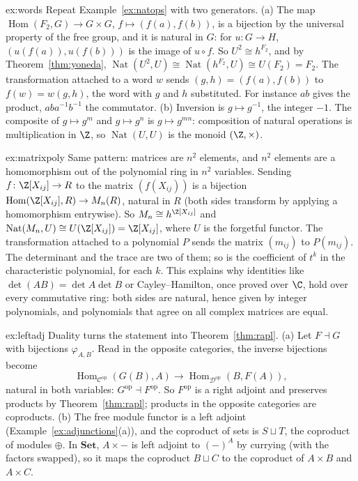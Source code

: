 \begin{solution}{ex:words}
\idea Repeat Example~\ref{ex:natops} with two generators.
\writeup (a) The map $\operatorname{Hom}(F_2,G)\to G\times G$, $f\mapsto(f(a),f(b))$, is a bijection by the universal property of the free group, and it is natural in $G$: for $u\colon G\to H$, $(u(f(a)),u(f(b)))$ is the image of $u\circ f$. So
$U^2\cong h^{F_2}$, and by Theorem~\ref{thm:yoneda}, $\operatorname{Nat}(U^2,U)\cong\operatorname{Nat}(h^{F_2},U)\cong U(F_2)=F_2$. The transformation attached to a word $w$ sends $(g,h)=(f(a),f(b))$ to $f(w)=w(g,h)$, the word with $g$ and $h$
substituted. For instance $ab$ gives the product, $aba^{-1}b^{-1}$ the commutator.
(b) Inversion is $g\mapsto g^{-1}$, the integer $-1$. The composite of $g\mapsto g^m$ and $g\mapsto g^n$ is $g\mapsto g^{mn}$: composition of natural operations is multiplication in $\Z$, so $\operatorname{Nat}(U,U)$ is the monoid $(\Z,\times)$.
\end{solution}

\begin{solution}{ex:matrixpoly}
\idea Same pattern: matrices are $n^2$ elements, and $n^2$ elements are a homomorphism out of the polynomial ring in $n^2$ variables.
\writeup Sending $f\colon\Z[X_{ij}]\to R$ to the matrix $(f(X_{ij}))$ is a bijection $\operatorname{Hom}(\Z[X_{ij}],R)\to M_n(R)$, natural in $R$ (both sides transform by applying a homomorphism entrywise). So $M_n\cong h^{\Z[X_{ij}]}$ and
$\operatorname{Nat}(M_n,U)\cong U(\Z[X_{ij}])=\Z[X_{ij}]$, where $U$ is the forgetful functor. The transformation attached to a polynomial $P$ sends the matrix $(m_{ij})$ to $P(m_{ij})$. The determinant and the trace are two of them; so is the
coefficient of $t^k$ in the characteristic polynomial, for each $k$. This explains why identities like $\det(AB)=\det A\det B$ or Cayley--Hamilton, once proved over $\C$, hold over every commutative ring: both sides are natural, hence given by integer
polynomials, and polynomials that agree on all complex matrices are equal.
\end{solution}

\begin{solution}{ex:leftadj}
\idea Duality turns the statement into Theorem~\ref{thm:rapl}.
\writeup (a) Let $F\dashv G$ with bijections $\varphi_{A,B}$. Read in the opposite categories, the inverse bijections become
\[\operatorname{Hom}_{\mathcal C^{\mathrm{op}}}(G(B),A)\to\operatorname{Hom}_{\mathcal D^{\mathrm{op}}}(B,F(A)),\]
natural in both variables: $G^{\mathrm{op}}\dashv F^{\mathrm{op}}$. So $F^{\mathrm{op}}$ is a right adjoint and preserves products by Theorem~\ref{thm:rapl};
products in the opposite categories are coproducts. (b) The free module functor is a left adjoint (Example~\ref{ex:adjunctions}(a)), and the coproduct of sets is $S\sqcup T$, the coproduct of modules $\oplus$. In $\mathbf{Set}$, $A\times-$ is
left adjoint to $(-)^A$ by currying (with the factors swapped), so it maps the coproduct $B\sqcup C$ to the coproduct of $A\times B$ and $A\times C$.
\end{solution}

